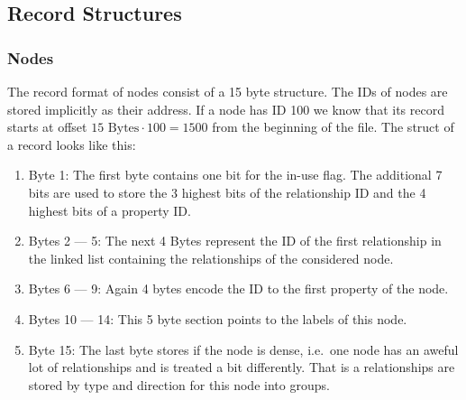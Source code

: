     \subsection*{Record Structures}
        \subsubsection*{Nodes}
            The record format of nodes consist of a 15 byte structure.
            The IDs of nodes are stored implicitly as their address.
            If a node has ID 100 we know that its record starts at offset $15 \text{ Bytes} \cdot 100 = 1500$ from the beginning of the file.
            The struct of a record looks like this:
            \begin{enumerate}
                \item Byte 1: The first byte contains one bit for the in-use flag. 
                    The additional 7 bits are used to store the 3 highest bits of the relationship ID and the 4 highest bits of a property ID\@.
                \item Bytes 2 --- 5: The next 4 Bytes represent the ID of the first relationship in the linked list containing the relationships of the considered node.
                \item Bytes 6 --- 9: Again 4 bytes encode the ID to the first property of the node.
                \item Bytes 10 --- 14: This 5 byte section points to the labels of this node.
                \item Byte 15: The last byte stores if the node is dense, i.e.\ one node has an aweful lot of relationships and is treated a bit differently.
                    That is a relationships are stored by type and direction for this node into groups.
            \end{enumerate}
        
